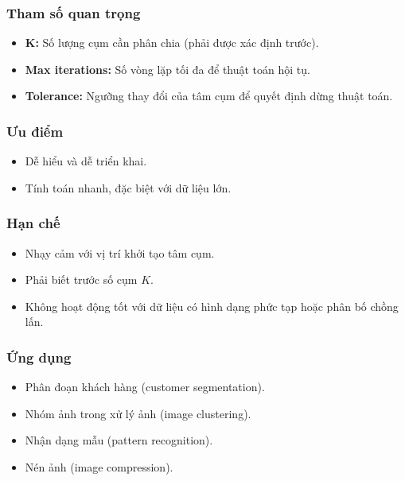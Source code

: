 \subsubsection*{Tham số quan trọng}

\begin{itemize}
    \item \textbf{K:} Số lượng cụm cần phân chia (phải được xác định trước).
    \item \textbf{Max iterations:} Số vòng lặp tối đa để thuật toán hội tụ.
    \item \textbf{Tolerance:} Ngưỡng thay đổi của tâm cụm để quyết định dừng thuật toán.
\end{itemize}

\subsubsection*{Ưu điểm}

\begin{itemize}
    \item Dễ hiểu và dễ triển khai.
    \item Tính toán nhanh, đặc biệt với dữ liệu lớn.
\end{itemize}

\subsubsection*{Hạn chế}

\begin{itemize}
    \item Nhạy cảm với vị trí khởi tạo tâm cụm.
    \item Phải biết trước số cụm $K$.
    \item Không hoạt động tốt với dữ liệu có hình dạng phức tạp hoặc phân bố chồng lấn.
\end{itemize}

\subsubsection*{Ứng dụng}

\begin{itemize}
    \item Phân đoạn khách hàng (customer segmentation).
    \item Nhóm ảnh trong xử lý ảnh (image clustering).
    \item Nhận dạng mẫu (pattern recognition).
    \item Nén ảnh (image compression).
\end{itemize}

